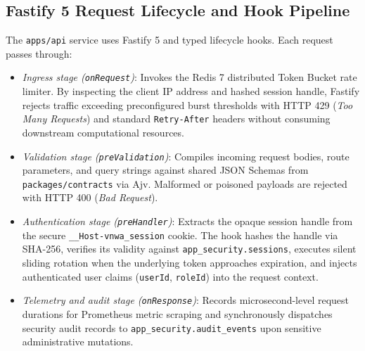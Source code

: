 \subsection{Fastify 5 Request Lifecycle and Hook Pipeline}
The \texttt{apps/api} service uses Fastify 5 and typed lifecycle hooks. Each request passes through:
\begin{itemize}
    \item[-] \textit{Ingress stage (\texttt{onRequest})}: Invokes the Redis 7 distributed Token Bucket rate limiter. By inspecting the client IP address and hashed session handle, Fastify rejects traffic exceeding preconfigured burst thresholds with HTTP 429 (\textit{Too Many Requests}) and standard \texttt{Retry-After} headers without consuming downstream computational resources.
    \item[-] \textit{Validation stage (\texttt{preValidation})}: Compiles incoming request bodies, route parameters, and query strings against shared JSON Schemas from \texttt{packages/contracts} via Ajv. Malformed or poisoned payloads are rejected with HTTP 400 (\textit{Bad Request}).
    \item[-] \textit{Authentication stage (\texttt{preHandler})}: Extracts the opaque session handle from the secure \texttt{\_\_Host-vnwa\_session} cookie. The hook hashes the handle via SHA-256, verifies its validity against \texttt{app\_security.sessions}, executes silent sliding rotation when the underlying token approaches expiration, and injects authenticated user claims (\texttt{userId}, \texttt{roleId}) into the request context.
    \item[-] \textit{Telemetry and audit stage (\texttt{onResponse})}: Records microsecond-level request durations for Prometheus metric scraping and synchronously dispatches security audit records to \texttt{app\_security.audit\_events} upon sensitive administrative mutations.
\end{itemize}

